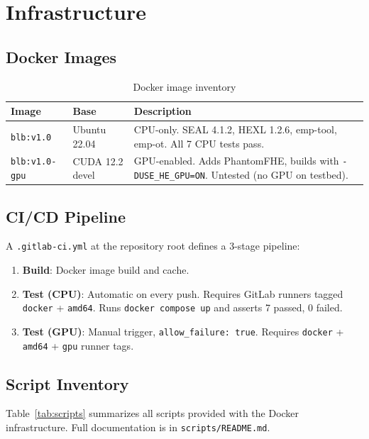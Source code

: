 \section{Infrastructure}\label{sec:infrastructure}

\subsection{Docker Images}

\begin{table}[h]
\centering
\caption{Docker image inventory}
\label{tab:images}
\begin{tabular}{llp{7cm}}
\toprule
Image & Base & Description \\
\midrule
\texttt{blb:v1.0} & Ubuntu 22.04 & CPU-only. SEAL 4.1.2, HEXL 1.2.6, emp-tool, emp-ot. All 7 CPU tests pass. \\
\texttt{blb:v1.0-gpu} & CUDA 12.2 devel & GPU-enabled. Adds PhantomFHE, builds with \texttt{-DUSE\_HE\_GPU=ON}. Untested (no GPU on testbed). \\
\bottomrule
\end{tabular}
\end{table}

\subsection{CI/CD Pipeline}

A \texttt{.gitlab-ci.yml} at the repository root defines a 3-stage pipeline:

\begin{enumerate}[nosep]
  \item \textbf{Build}: Docker image build and cache.
  \item \textbf{Test (CPU)}: Automatic on every push. Requires GitLab runners tagged \texttt{docker} + \texttt{amd64}. Runs \texttt{docker compose up} and asserts 7 passed, 0 failed.
  \item \textbf{Test (GPU)}: Manual trigger, \texttt{allow\_failure: true}. Requires \texttt{docker} + \texttt{amd64} + \texttt{gpu} runner tags.
\end{enumerate}

\subsection{Script Inventory}

Table~\ref{tab:scripts} summarizes all scripts provided with the Docker infrastructure.
Full documentation is in \texttt{scripts/README.md}.

